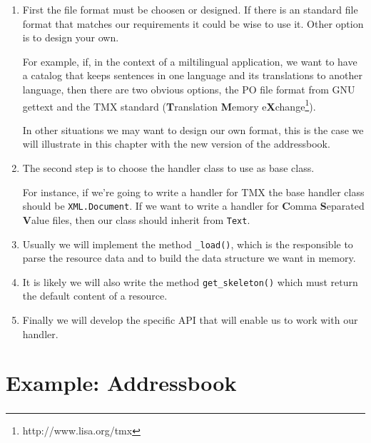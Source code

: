 \begin{enumerate}
  \item First the file format must be choosen or designed. If there is an
    standard file format that matches our requirements it could be wise to
    use it. Other option is to design your own.

    For example, if, in the context of a miltilingual application, we want
    to have a catalog that keeps sentences in one language and its
    translations to another language, then there are two obvious options,
    the PO file format from GNU gettext and the TMX standard ({\bf T}ranslation
    {\bf M}emory e{\bf X}change\footnote{http://www.lisa.org/tmx}).

    In other situations we may want to design our own format, this is the
    case we will illustrate in this chapter with the new version of
    the addressbook.

  \item The second step is to choose the handler class to use as base class.

    For instance, if we're going to write a handler for TMX the base handler
    class should be {\tt XML.Document}. If we want to write a handler for
    {\bf C}omma {\bf S}eparated {\bf V}alue files, then our class should
    inherit from {\tt Text}.

  \item Usually we will implement the method {\tt \_load()}, which is the
    responsible to parse the resource data and to build the data structure
    we want in memory.

  \item It is likely we will also write the method {\tt get\_skeleton()}
    which must return the default content of a resource.

  \item Finally we will develop the specific API that will enable us to
    work with our handler.
\end{enumerate}

\section{Example: Addressbook}

\subsubsection{}